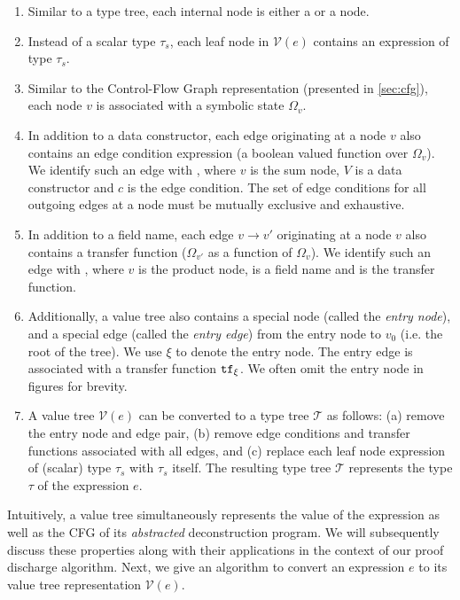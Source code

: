 \begin{enumerate}
\item Similar to a type tree, each internal node is either a \sumn{} or a \prodn{} node.
\item Instead of a scalar type $\tau_s$, each leaf node in $\mathcal{V}(e)$ contains an expression
of type $\tau_s$.
\item Similar to the Control-Flow Graph representation (presented in \cref{sec:cfg}), each node $v$
is associated with a symbolic state $\Omega_v$.
\item In addition to a data constructor, each edge originating at a \sumn{} node $v$ also contains
an edge condition expression (a boolean valued function over $\Omega_v$).
We identify such an edge with , where $v$ is the sum node,
$V$ is a data constructor and $c$ is the edge condition.
The set of edge conditions for all outgoing edges at a \sumn{} node must be mutually exclusive and exhaustive.
\item In addition to a field name, each edge $v \rightarrow v'$ originating at a \prodn{} node $v$ also contains
a transfer function ($\Omega_{v'}$ as a function of $\Omega_v$).
We identify such an edge with , where $v$ is the product node,
 is a field name and \xfer{} is the transfer function.
\item Additionally, a value tree also contains a special node (called the {\em entry node}), and a special edge
(called the {\em entry edge}) from the entry node to $v_0$ (i.e. the root of the tree).
We use $\xi$ to denote the entry node.
The entry edge is associated with a transfer function ${\tt tf}{}_\xi$.
We often omit the entry node in figures for brevity.
\item A value tree $\mathcal{V}(e)$ can be converted to a type tree $\mathcal{T}$ as follows:
(a) remove the entry node and edge pair, (b) remove edge conditions and transfer functions
associated with all edges, and (c) replace each leaf node expression of (scalar) type $\tau_s$
with $\tau_s$ itself.
The resulting type tree $\mathcal{T}$ represents the type $\tau$ of the expression $e$.
\end{enumerate}

Intuitively, a value tree simultaneously represents the value of the expression as well as
the CFG of its {\em abstracted} deconstruction program.
We will subsequently discuss these properties along with their applications in the context
of our proof discharge algorithm.
Next, we give an algorithm to convert an expression $e$ to its value tree representation $\mathcal{V}(e)$.

